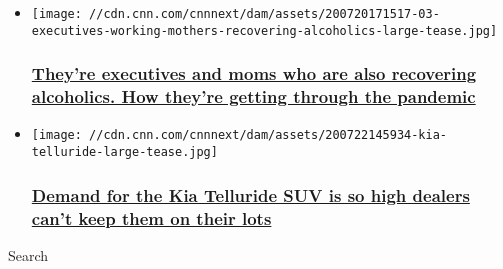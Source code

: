 \begin{itemize}
\item
  \href{/2020/07/22/success/executives-working-parents-addiction-pandemic/index.html}{}

  \texttt{[image: //cdn.cnn.com/cnnnext/dam/assets/200720171517-03-executives-working-mothers-recovering-alcoholics-large-tease.jpg]}

  \hypertarget{theyre-executives-and-moms-who-are-also-recovering-alcoholics-how-theyre-getting-through-the-pandemic}{%
  \subsubsection{\texorpdfstring{\href{/2020/07/22/success/executives-working-parents-addiction-pandemic/index.html}{They're
  executives and moms who are also recovering alcoholics. How they're
  getting through the
  pandemic}}{They're executives and moms who are also recovering alcoholics. How they're getting through the pandemic}}\label{theyre-executives-and-moms-who-are-also-recovering-alcoholics-how-theyre-getting-through-the-pandemic}}
\item
  \href{/2020/07/23/success/kia-telluride-suv-demand/index.html}{}

  \texttt{[image: //cdn.cnn.com/cnnnext/dam/assets/200722145934-kia-telluride-large-tease.jpg]}

  \hypertarget{demand-for-the-kia-telluride-suv-is-so-high-dealers-cant-keep-them-on-their-lots}{%
  \subsubsection{\texorpdfstring{\href{/2020/07/23/success/kia-telluride-suv-demand/index.html}{Demand
  for the Kia Telluride SUV is so high dealers can't keep them on their
  lots}}{Demand for the Kia Telluride SUV is so high dealers can't keep them on their lots}}\label{demand-for-the-kia-telluride-suv-is-so-high-dealers-cant-keep-them-on-their-lots}}
\end{itemize}

Search

